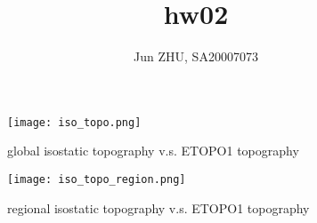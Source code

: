 \documentclass{article}
\title{hw02}
\author{Jun ZHU, SA20007073}
\begin{document}
\maketitle
\begin{figure}[H]
  \centering
  \texttt{[image: iso\_topo.png]}
  \caption{global isostatic topography v.s. ETOPO1 topography}
\end{figure}
\begin{figure}[H]
  \centering
  \texttt{[image: iso\_topo\_region.png]}
  \caption{regional isostatic topography v.s. ETOPO1 topography}
\end{figure}
\end{document}
